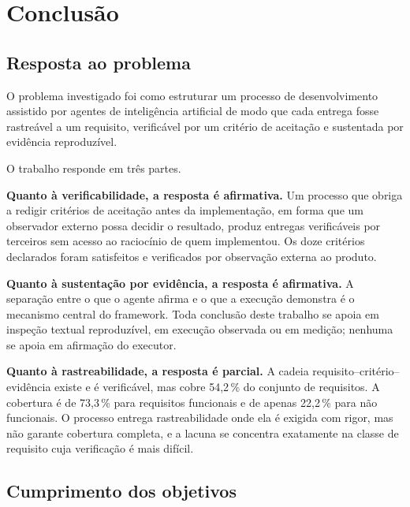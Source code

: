 
\chapter{Conclusão}
\label{cap:conclusao}

\section{Resposta ao problema}
\label{sec:conc-resposta}

O problema investigado foi como estruturar um processo de desenvolvimento
assistido por agentes de inteligência artificial de modo que cada entrega fosse
rastreável a um requisito, verificável por um critério de aceitação e sustentada
por evidência reproduzível.

O trabalho responde em três partes.

\textbf{Quanto à verificabilidade, a resposta é afirmativa.} Um processo que
obriga a redigir critérios de aceitação antes da implementação, em forma que um
observador externo possa decidir o resultado, produz entregas verificáveis por
terceiros sem acesso ao raciocínio de quem implementou. Os doze critérios
declarados foram satisfeitos e verificados por observação externa ao produto.

\textbf{Quanto à sustentação por evidência, a resposta é afirmativa.} A
separação entre o que o agente afirma e o que a execução demonstra é o mecanismo
central do framework. Toda conclusão deste trabalho se apoia em inspeção textual
reproduzível, em execução observada ou em medição; nenhuma se apoia em afirmação
do executor.

\textbf{Quanto à rastreabilidade, a resposta é parcial.} A cadeia
requisito--critério--evidência existe e é verificável, mas cobre 54,2\,\% do
conjunto de requisitos. A cobertura é de 73,3\,\% para requisitos funcionais e de
apenas 22,2\,\% para não funcionais. O processo entrega rastreabilidade onde ela é
exigida com rigor, mas não garante cobertura completa, e a lacuna se concentra
exatamente na classe de requisito cuja verificação é mais difícil.

\section{Cumprimento dos objetivos}
\label{sec:conc-objetivos}

